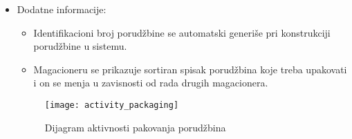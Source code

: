 \begin{itemize}
\begin{enumerate}
		\end{enumerate}
		\item{Dodatne informacije:}
		\begin{itemize}
			\item{Identifikacioni broj porudžbine se automatski generiše pri konstrukciji porudžbine u sistemu.}
			\item{Magacioneru se prikazuje sortiran spisak porudžbina koje treba upakovati i on se menja u zavisnosti od rada drugih magacionera. }
		\end{itemize}
	\begin{figure}[H]
		\begin{center}
			\texttt{[image: activity\_packaging]}
			\caption{Dijagram aktivnosti pakovanja porudžbina}		
		\end{center}
	\end{figure}
	\end{itemize}
